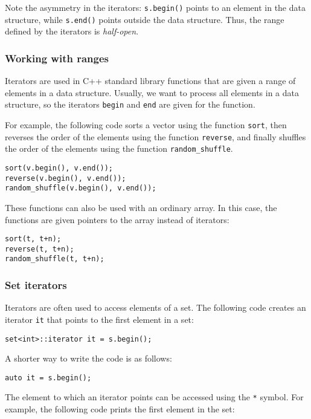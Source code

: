 Note the asymmetry in the iterators:
\texttt{s.begin()} points to an element in the data structure,
while \texttt{s.end()} points outside the data structure.
Thus, the range defined by the iterators is \emph{half-open}.

\subsubsection{Working with ranges}

Iterators are used in C++ standard library functions
that are given a range of elements in a data structure.
Usually, we want to process all elements in a
data structure, so the iterators
\texttt{begin} and \texttt{end} are given for the function.

For example, the following code sorts a vector
using the function \texttt{sort},
then reverses the order of the elements using the function
\texttt{reverse}, and finally shuffles the order of
the elements using the function \texttt{random\_shuffle}.


\begin{lstlisting}
sort(v.begin(), v.end());
reverse(v.begin(), v.end());
random_shuffle(v.begin(), v.end());
\end{lstlisting}

These functions can also be used with an ordinary array.
In this case, the functions are given pointers to the array
instead of iterators:

\newpage
\begin{lstlisting}
sort(t, t+n);
reverse(t, t+n);
random_shuffle(t, t+n);
\end{lstlisting}

\subsubsection{Set iterators}

Iterators are often used to access
elements of a set.
The following code creates an iterator
\texttt{it} that points to the first element in a set:
\begin{lstlisting}
set<int>::iterator it = s.begin();
\end{lstlisting}
A shorter way to write the code is as follows:
\begin{lstlisting}
auto it = s.begin();
\end{lstlisting}
The element to which an iterator points
can be accessed using the \texttt{*} symbol.
For example, the following code prints
the first element in the set:

